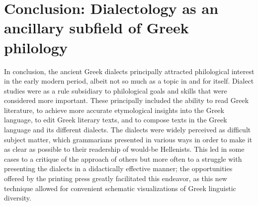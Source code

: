 \section{Conclusion: Dialectology as an ancillary subfield of Greek philology}

In conclusion, the ancient Greek dialects principally attracted philological interest in the early modern period, albeit not so much as a topic in and for itself. Dialect studies were as a rule subsidiary to philological goals and skills that were considered more important. These principally included the ability to read Greek literature, to achieve more accurate etymological insights into the Greek language, to edit Greek literary texts, and to compose texts in the Greek language and its different dialects. The dialects were widely perceived as difficult subject matter, which grammarians presented in various ways in order to make it as clear as possible to their readership of would-be Hellenists. This led in some cases to a critique of the approach of others but more often to a struggle with presenting the dialects in a didactically effective manner; the opportunities offered by the printing press greatly facilitated this endeavor, as this new technique allowed for convenient schematic visualizations of Greek linguistic diversity.

